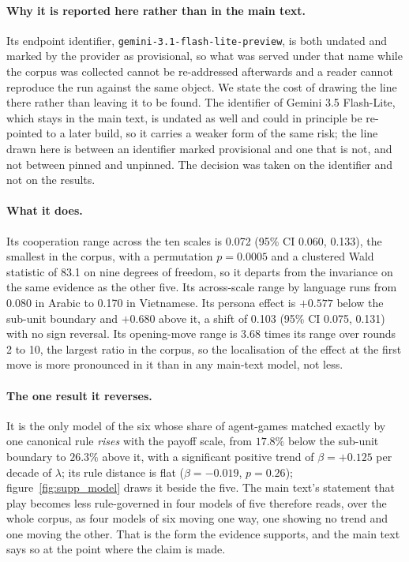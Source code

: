 \documentclass[11pt,a4paper]{article}
\newcommand{\lam}{\lambda}
\newcommand{\ci}[2]{(95\% CI #1, #2)}
\begin{document}
\paragraph{Why it is reported here rather than in the main text.} Its endpoint
identifier, \texttt{gemini-3.1-\allowbreak flash-lite-\allowbreak preview}, is both undated and marked by the provider as provisional, so what was served under that name while the corpus was collected cannot be re-addressed afterwards and a reader cannot reproduce the run against the same object. We state the cost of drawing the line there rather than leaving it to be found. The identifier of Gemini 3.5 Flash-Lite, which stays in the main text, is undated as well and could in principle be re-pointed to a later build, so it carries a weaker form of the same risk; the line drawn here is between an identifier marked provisional and one that is not, and not between pinned and unpinned. The decision was taken on the identifier and not on the results.

\paragraph{What it does.} Its cooperation range across the ten scales is 0.072
\ci{0.060}{0.133}, the smallest in the corpus, with a permutation $p = 0.0005$ and a clustered Wald statistic of 83.1 on nine degrees of freedom, so it departs from the invariance on the same evidence as the other five. Its across-scale range by language runs from 0.080 in Arabic to 0.170 in Vietnamese. Its persona effect is $+0.577$ below the sub-unit boundary and $+0.680$ above it, a shift of 0.103 \ci{0.075}{0.131} with no sign reversal. Its opening-move range is 3.68 times its range over rounds 2 to 10, the largest ratio in the corpus, so the localisation of the effect at the first move is more pronounced in it than in any main-text model, not less.

\paragraph{The one result it reverses.} It is the only model of the six whose
share of agent-games matched exactly by one canonical rule \emph{rises} with the payoff scale, from $17.8\%$ below the sub-unit boundary to $26.3\%$ above it, with a significant positive trend of $\beta = +0.125$ per decade of $\lam$; its rule distance is flat ($\beta = -0.019$, $p = 0.26$); figure~\ref{fig:supp_model} draws it beside the five. The main text's statement that play becomes less rule-governed in four models of five therefore reads, over the whole corpus, as four models of six moving one way, one showing no trend and one moving the other. That is the form the evidence supports, and the main text says so at the point where the claim is made.
\end{document}

